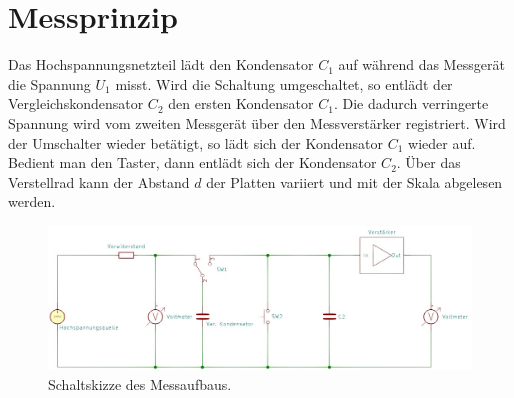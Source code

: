 \section{Messprinzip}
Das Hochspannungsnetzteil lädt den Kondensator $ C_{1} $ auf während das Messgerät die Spannung $ U_{1} $ misst.
Wird die Schaltung umgeschaltet, so entlädt der Vergleichskondensator $ C_{2} $ den ersten Kondensator $ C_{1} $. Die
dadurch verringerte Spannung wird vom zweiten Messgerät über den Messverstärker registriert. Wird der Umschalter wieder
betätigt, so lädt sich der Kondensator $ C_{1} $ wieder auf. Bedient man den Taster, dann entlädt sich der Kondensator
$ C_{2} $. Über das Verstellrad kann der Abstand $ d $ der Platten variiert und mit der Skala abgelesen werden.
\begin{figure}[h]
    \centering
    \includegraphics[width=\textwidth]{kicad/abbildungen/aufbau.jpg}
    \caption[Schaltskizze des Messaufbaus]{Schaltskizze des Messaufbaus.}
    \label{fig:schematic_aufbau}
\end{figure}